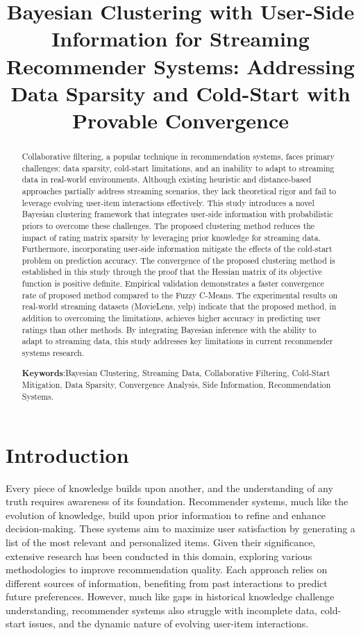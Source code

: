 \documentclass{article}
\title{Bayesian Clustering with User-Side Information for Streaming Recommender Systems: Addressing Data Sparsity and Cold-Start with Provable Convergence}
\author{}
\begin{document}
\maketitle

\begin{abstract}
Collaborative filtering, a popular technique in recommendation systems, faces primary challenges: data sparsity, cold-start limitations, and an inability to adapt to streaming data in real-world environments. Although existing heuristic and distance-based approaches partially address streaming scenarios, they lack theoretical rigor and fail to leverage evolving user-item interactions effectively. This study introduces a novel Bayesian clustering framework that integrates user-side information with probabilistic priors to overcome these challenges. 
The proposed clustering method reduces the impact of rating matrix sparsity by leveraging prior knowledge for streaming data. Furthermore, incorporating user-side information mitigate the effects of the cold-start problem on prediction accuracy.
The convergence of the proposed clustering method is established in this study through the proof that the Hessian matrix of its objective function is positive definite. Empirical validation demonstrates a faster convergence rate of proposed method compared to the Fuzzy C-Means. The experimental results on real-world streaming datasets (MovieLens, yelp) indicate that the proposed method, in addition to overcoming the limitations, achieves higher accuracy in predicting user ratings than other methods. By integrating Bayesian inference with the ability to adapt to streaming data, this study addresses key limitations in current recommender systems research. 

\textbf{Keywords}:Bayesian Clustering, Streaming Data, Collaborative Filtering, Cold-Start Mitigation, Data Sparsity, Convergence Analysis, Side Information, Recommendation Systems.
\end{abstract}

\section{Introduction}
Every piece of knowledge builds upon another, and the understanding of any truth requires awareness of its foundation. 
Recommender systems, much like the evolution of knowledge, build upon prior information to refine and enhance decision-making. These systems aim to maximize user satisfaction by generating a list of the most relevant and personalized items. Given their significance, extensive research has been conducted in this domain, exploring various methodologies to improve recommendation quality. Each approach relies on different sources of information, benefiting from past interactions to predict future preferences. However, much like gaps in historical knowledge challenge understanding, recommender systems also struggle with incomplete data, cold-start issues, and the dynamic nature of evolving user-item interactions.
\end{document}
